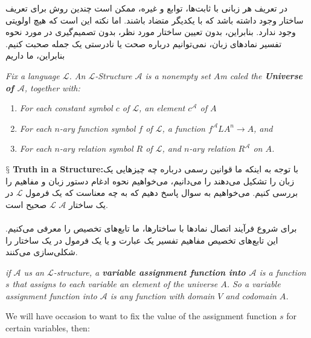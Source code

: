 \documentclass[10pt,a4paper]{article}
\newcommand{\newpoint}[1]{\indent$\mathsection$ \textbf{#1}}
\newcommand{\curveL}{\mathcal{L}}
\newcommand{\curveA}{\mathcal{A}}
\begin{document}
در تعریف هر زبانی با ثابت‌ها، توابع و غیره، ممکن است چندین روش برای تعریف ساختار وجود داشته باشد که با یکدیگر متضاد باشند. اما نکته این است که هیچ اولویتی وجود ندارد. بنابراین، بدون تعیین ساختار مورد نظر، بدون تصمیم‌گیری در مورد نحوه تفسیر نمادهای زبان، نمی‌توانیم درباره صحت یا نادرستی یک جمله صحبت کنیم. بنابراین، ما داریم
                    \begin{define}
                        \textit{Fix a language $\curveL$. An $\curveL$-Structure $\curveA$ is a nonempty set $A$m caled the \textbf{Universe of $\curveA$}, together with:}
                        \begin{enumerate}
                            \item \textit{For each constant symbol $c$ of $\curveL$, an element $c^\curveA$ of $A$}
                            \item \textit{For each $n$-ary function symbol $f$ of $\curveL$, a function $f^\curveA L A^n\rightarrow A$, and }
                            \item \textit{For each $n$-ary relation symbol $R$ of $\curveL$, and $n$-ary relation $R^\curveA$ on $A$.}
                        \end{enumerate}
                    \end{define}
                    \newpoint{Truth in a Structure:}با توجه به اینکه ما قوانین رسمی درباره چه چیزهایی یک زبان را تشکیل می‌دهند را می‌دانیم، می‌خواهیم نحوه ادغام دستور زبان و مفاهیم را بررسی کنیم. می‌خواهیم به سوال پاسخ دهیم که به چه معناست که یک فرمول $\curveL$ در یک ساختار $\curveA$ $\curveL$ صحیح است.
                    \\
                    \\
برای شروع فرآیند اتصال نمادها با ساختارها، ما تابع‌های تخصیص را معرفی می‌کنیم. این تابع‌های تخصیص مفاهیم تفسیر یک عبارت و یا یک فرمول در یک ساختار را شکلی‌سازی می‌کنند.
                    \begin{define}
                        \textit{if $\curveA$ us an $\curveL$-structure, a \textbf{variable assignment function into $\curveA$} is a function $s$ that assigns to each variable an element of the universe $A$. So a variable assignment function into $\curveA$ is any function with domain $V$ and codomain $A$.}
                    \end{define}
                    We will have occasion to want to fix the value of the assignment function $s$ for certain variables, then:
\end{document}
